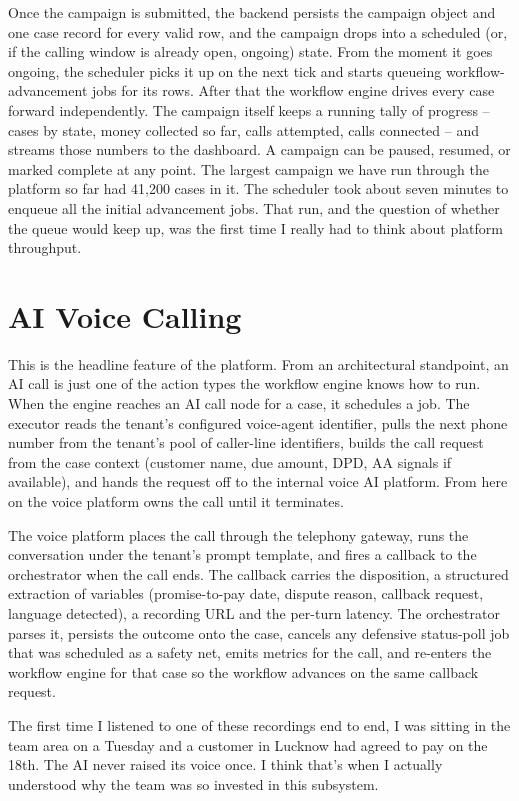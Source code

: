 Once the campaign is submitted, the backend persists the campaign object and one case record for every valid row, and the campaign drops into a scheduled (or, if the calling window is already open, ongoing) state. From the moment it goes ongoing, the scheduler picks it up on the next tick and starts queueing workflow-advancement jobs for its rows. After that the workflow engine drives every case forward independently. The campaign itself keeps a running tally of progress -- cases by state, money collected so far, calls attempted, calls connected -- and streams those numbers to the dashboard. A campaign can be paused, resumed, or marked complete at any point. The largest campaign we have run through the platform so far had 41,200 cases in it. The scheduler took about seven minutes to enqueue all the initial advancement jobs. That run, and the question of whether the queue would keep up, was the first time I really had to think about platform throughput.

\section{AI Voice Calling}
\label{sec:voice}
This is the headline feature of the platform. From an architectural standpoint, an AI call is just one of the action types the workflow engine knows how to run. When the engine reaches an AI call node for a case, it schedules a job. The executor reads the tenant's configured voice-agent identifier, pulls the next phone number from the tenant's pool of caller-line identifiers, builds the call request from the case context (customer name, due amount, DPD, AA signals if available), and hands the request off to the internal voice AI platform. From here on the voice platform owns the call until it terminates.

The voice platform places the call through the telephony gateway, runs the conversation under the tenant's prompt template, and fires a callback to the orchestrator when the call ends. The callback carries the disposition, a structured extraction of variables (promise-to-pay date, dispute reason, callback request, language detected), a recording URL and the per-turn latency. The orchestrator parses it, persists the outcome onto the case, cancels any defensive status-poll job that was scheduled as a safety net, emits metrics for the call, and re-enters the workflow engine for that case so the workflow advances on the same callback request.

The first time I listened to one of these recordings end to end, I was sitting in the team area on a Tuesday and a customer in Lucknow had agreed to pay on the 18th. The AI never raised its voice once. I think that's when I actually understood why the team was so invested in this subsystem.


